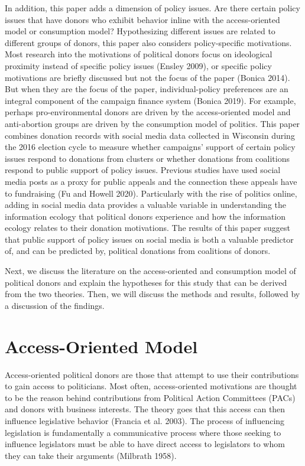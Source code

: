 \documentclass[12pt,]{article}
\begin{document}
In addition, this paper adds a dimension of policy issues. Are there
certain policy issues that have donors who exhibit behavior inline with
the access-oriented model or consumption model? Hypothesizing different
issues are related to different groups of donors, this paper also
considers policy-specific motivations. Most research into the
motivations of political donors focus on ideological proximity instead
of specific policy issues (Ensley 2009), or specific policy motivations
are briefly discussed but not the focus of the paper (Bonica 2014). But
when they are the focus of the paper, individual-policy preferences are
an integral component of the campaign finance system (Bonica 2019). For
example, perhaps pro-environmental donors are driven by the
access-oriented model and anti-abortion groups are driven by the
consumption model of politics. This paper combines donation records with
social media data collected in Wisconsin during the 2016 election cycle
to measure whether campaigns' support of certain policy issues respond
to donations from clusters or whether donations from coalitions respond
to public support of policy issues. Previous studies have used social
media posts as a proxy for public appeals and the connection these
appeals have to fundraising (Fu and Howell 2020). Particularly with the
rise of politics online, adding in social media data provides a valuable
variable in understanding the information ecology that political donors
experience and how the information ecology relates to their donation
motivations. The results of this paper suggest that public support of
policy issues on social media is both a valuable predictor of, and can
be predicted by, political donations from coalitions of donors.

Next, we discuss the literature on the access-oriented and consumption
model of political donors and explain the hypotheses for this study that
can be derived from the two theories. Then, we will discuss the methods
and results, followed by a discussion of the findings.

\hypertarget{access-oriented-model}{%
\section{Access-Oriented Model}\label{access-oriented-model}}

Access-oriented political donors are those that attempt to use their
contributions to gain access to politicians. Most often, access-oriented
motivations are thought to be the reason behind contributions from
Political Action Committees (PACs) and donors with business interests.
The theory goes that this access can then influence legislative behavior
(Francia et al. 2003). The process of influencing legislation is
fundamentally a communicative process where those seeking to influence
legislators must be able to have direct access to legislators to whom
they can take their arguments (Milbrath 1958).
\end{document}
